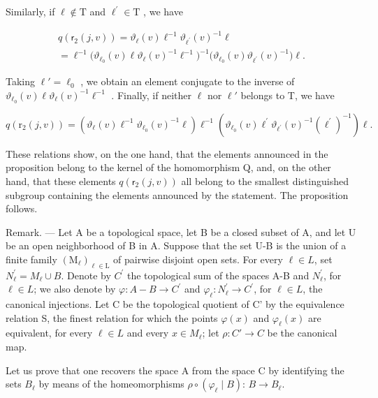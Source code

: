 Similarly, if \(\ell\notin\mathrm{T}\) and \(\ell^{\prime}\in\mathrm{T}\) , we have

\[
\begin{array}{c} q (\mathsf {r} _ {2} (j, v)) = \vartheta_ {\ell} (v) \ell^ {- 1} \vartheta_ {\ell^ {\prime}} (v) ^ {- 1} \ell \\ = \ell^ {- 1} \bigl (\vartheta_ {\ell_ {0}} (v) \ell \vartheta_ {\ell} (v) ^ {- 1} \ell^ {- 1} \bigr) ^ {- 1} \bigl (\vartheta_ {\ell_ {0}} (v) \vartheta_ {\ell^ {\prime}} (v) ^ {- 1} \bigr) \ell . \end{array}
\]

Taking \(\ell' = \ell_0\) , we obtain an element conjugate to the inverse of \(\vartheta_{\ell_0}(v)\ell\vartheta_\ell(v)^{-1}\ell^{-1}\) . Finally, if neither \(\ell\) nor \(\ell'\) belongs to T, we have

\[
q \left(\mathrm{r} _ {2} (j, v)\right) = \left(\vartheta_ {\ell} (v) \ell^ {- 1} \vartheta_ {\ell_ {0}} (v) ^ {- 1} \ell\right) \ell^ {- 1} \left(\vartheta_ {\ell_ {0}} (v) \ell^ {\prime} \vartheta_ {\ell^ {\prime}} (v) ^ {- 1} \left(\ell^ {\prime}\right) ^ {- 1}\right) \ell .
\]

These relations show, on the one hand, that the elements announced in the proposition belong to the kernel of the homomorphism Q, and, on the other hand, that these elements \(q(\mathsf{r}_{2}(j,v))\) all belong to the smallest distinguished subgroup containing the elements announced by the statement. The proposition follows.

Remark. --- Let A be a topological space, let B be a closed subset of A, and let U be an open neighborhood of B in A. Suppose that the set U-B is the union of a finite family \((\mathrm{M}_{\ell})_{\ell\in\mathrm{L}}\) of pairwise disjoint open sets. For every \(\ell\in L\), set \(N_{\ell}^{\prime}=M_{\ell}\cup B\). Denote by \(C^{\prime}\) the topological sum of the spaces A-B and \(N_{\ell}^{\prime}\), for \(\ell\in L\); we also denote by \(\varphi:A-B\to C^{\prime}\) and \(\varphi_{\ell}:N_{\ell}^{\prime}\to C^{\prime}\), for \(\ell\in L\), the canonical injections. Let C be the topological quotient of C' by the equivalence relation S, the finest relation for which the points \(\varphi(x)\) and \(\varphi_{\ell}(x)\) are equivalent, for every \(\ell \in L\) and every \(x \in M_{\ell}\); let \(\rho: C' \to C\) be the canonical map.

Let us prove that one recovers the space A from the space C by identifying the sets \(B_{\ell}\) by means of the homeomorphisms \(\rho \circ (\varphi_{\ell} \mid B)\): \(B \to B_{\ell}\).

